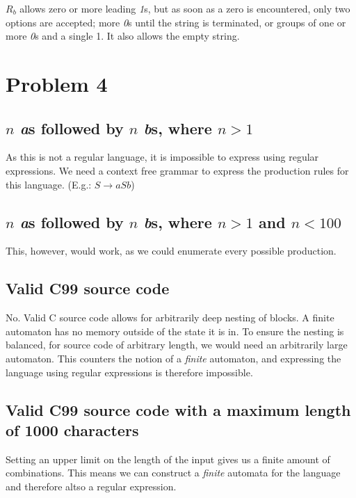 \documentclass[twoside]{article}
\begin{document}
\begin{multicols}{2}
$R_b$ allows zero or more leading \textit{1}s, but as soon as a zero is encountered, only two options are accepted;
more \textit{0}s until the string is terminated, or groups of one or more \textit{0}s and a single 1. It also allows the empty string.

\section{Problem 4}

\subsection{$n$ \textit{a}s followed by $n$ \textit{b}s, where $n > 1$}

As this is not a regular language, it is impossible to express using regular expressions. We need a context free grammar to express the production rules for this language. (E.g.: $S \rightarrow aSb$)

\subsection{$n$ \textit{a}s followed by $n$ \textit{b}s, where $n > 1$ and $n < 100$}

This, however, would work, as we could enumerate every possible production.


\subsection{Valid C99 source code}

No. Valid C source code allows for arbitrarily deep nesting of blocks.
A finite automaton has no memory outside of the state it is in.
To ensure the nesting is balanced, for source code of arbitrary length, we would need an arbitrarily large automaton.
This counters the notion of a \textit{finite} automaton, and expressing the language using regular expressions is therefore impossible.

\subsection{Valid C99 source code with a maximum length of 1000 characters}

Setting an upper limit on the length of the input gives us a finite amount of combinations. This means we can construct a \textit{finite} automata for the language and therefore altso a regular expression.

\end{multicols}
\end{document}
